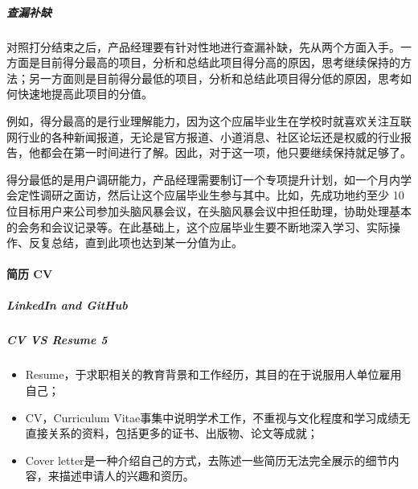 \documentclass[letterpaper,10pt,english]{sphinxmanual}
\begin{document}
\subparagraph{查漏补缺}
\label{\detokenize{chapter_interview/new_like:id21}}
对照打分结束之后，产品经理要有针对性地进行查漏补缺，先从两个方面入手。一方面是目前得分最高的项目，分析和总结此项目得分高的原因，思考继续保持的方法；另一方面则是目前得分最低的项目，分析和总结此项目得分低的原因，思考如何快速地提高此项目的分值。

例如，得分最高的是行业理解能力，因为这个应届毕业生在学校时就喜欢关注互联网行业的各种新闻报道，无论是官方报道、小道消息、社区论坛还是权威的行业报告，他都会在第一时间进行了解。因此，对于这一项，他只要继续保持就足够了。

得分最低的是用户调研能力，产品经理需要制订一个专项提升计划，如一个月内学会定性调研之面访，然后让这个应届毕业生参与其中。比如，先成功地约至少
10
位目标用户来公司参加头脑风暴会议，在头脑风暴会议中担任助理，协助处理基本的会务和会议记录等。在此基础上，这个应届毕业生要不断地深入学习、实际操作、反复总结，直到此项也达到某一分值为止。


\paragraph{简历 CV}
\label{\detokenize{chapter_interview/CV:cv}}\label{\detokenize{chapter_interview/CV::doc}}
\begin{center}\end{center} 


\subparagraph{LinkedIn and GitHub}
\label{\detokenize{chapter_interview/CV:linkedin-and-github}}


\subparagraph{CV VS Resume 5\sphinxfootnotemark[841]}
\label{\detokenize{chapter_interview/CV:cv-vs-resume-5}}%
\begin{footnotetext}[841]\sphinxAtStartFootnote
{}
%
\end{footnotetext}\ignorespaces \begin{itemize}
\item {} 
Resume，于求职相关的教育背景和工作经历，其目的在于说服用人单位雇用自己；

\item {} 
CV，Curriculum
Vitae事集中说明学术工作，不重视与文化程度和学习成绩无直接关系的资料，包括更多的证书、出版物、论文等成就；

\item {} 
Cover
letter是一种介绍自己的方式，去陈述一些简历无法完全展示的细节内容，来描述申请人的兴趣和资历。

\end{itemize}
\end{document}
